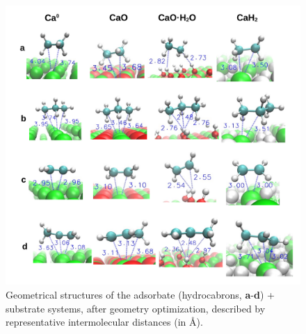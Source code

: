 \documentclass[journal=jpccck,manuscript=article]{achemso}
\begin{document}
\begin{figure}[!b]
	\centering
	\includegraphics[width=\linewidth]{Figure8}
	\caption{Geometrical structures of the adsorbate (hydrocabrons, \textbf{a}-\textbf{d}) + substrate systems, after geometry optimization, described by representative intermolecular distances (in \si{\angstrom}). }
	\label{fig:distsad}
\end{figure}
\end{document}
